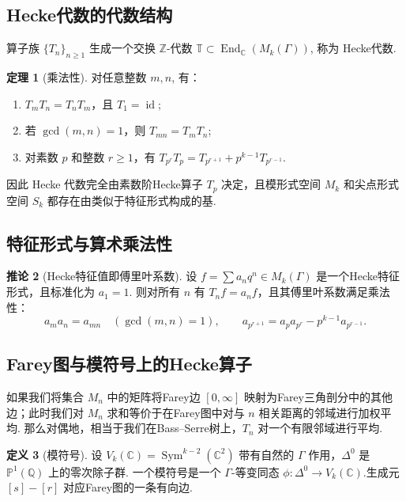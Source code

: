 \documentclass[10pt,UTF8]{ctexart}
\newcommand{\C}{\mathbb{C}}
\newcommand{\Q}{\mathbb{Q}}
\theoremstyle{definition}
\newtheorem{theorem}{定理}[section]
\newtheorem{corollary}[theorem]{推论}
\newtheorem{definition}[theorem]{定义}
\theoremstyle{remark}
\begin{document}
\subsection{Hecke代数的代数结构}

算子族 $\{T_n\}_{n\geq 1}$ 生成一个交换 $\mathbb{Z}$-代数 $\mathbb{T} \subset \operatorname{End}_{\C}(M_k(\Gamma))$, 称为 Hecke代数.

\begin{theorem}[乘法性]
对任意整数 $m,n$, 有：
\begin{enumerate}
    \item $T_m T_n = T_n T_m$，且 $T_1 = \operatorname{id}$;
    \item 若 $\gcd(m,n)=1$，则 $T_{mn} = T_m T_n$;
    \item 对素数 $p$ 和整数 $r\geq 1$，有 $T_{p^r} T_p = T_{p^{r+1}} + p^{k-1} T_{p^{r-1}}$. 
\end{enumerate}
\end{theorem}

因此 Hecke 代数完全由素数阶Hecke算子 $T_p$ 决定，且模形式空间 $M_k$ 和尖点形式空间 $S_k$ 都存在由类似于特征形式构成的基.

\subsection{特征形式与算术乘法性}

\begin{corollary}[Hecke特征值即傅里叶系数]
设 $f = \sum a_n q^n \in M_k(\Gamma)$ 是一个Hecke特征形式，且标准化为 $a_1=1$. 则对所有 $n$ 有 $T_n f = a_n f$，且其傅里叶系数满足乘法性：
\[
a_m a_n = a_{mn} \quad (\gcd(m,n)=1),\qquad
a_{p^{r+1}} = a_p a_{p^r} - p^{k-1} a_{p^{r-1}}.
\]
\end{corollary}



\subsection{Farey图与模符号上的Hecke算子}
\label{subsec:farey_hecke}

如果我们将集合 $M_n$ 中的矩阵将Farey边 $[0,\infty]$ 映射为Farey三角剖分中的其他边；此时我们对 $M_n$ 求和等价于在Farey图中对与 $n$ 相关距离的邻域进行加权平均. 那么对偶地，相当于我们在Bass–Serre树上，$T_n$ 对一个有限邻域进行平均. 

\begin{definition}[模符号]
设 $V_k(\C) = \operatorname{Sym}^{k-2}(\C^2)$ 带有自然的 $\Gamma$ 作用，$\Delta^0$ 是 $\mathbb P^1(\Q)$ 上的零次除子群. 一个模符号是一个 $\Gamma$-等变同态 $\phi : \Delta^0 \to V_k(\C)$.生成元 $[s]-[r]$ 对应Farey图的一条有向边. 
\end{definition}
\end{document}
